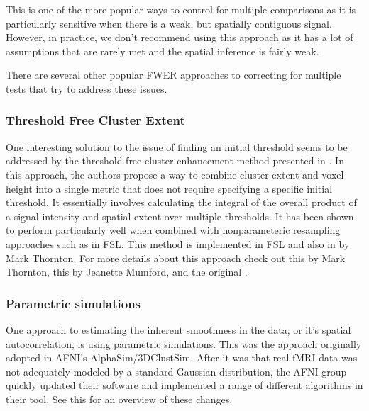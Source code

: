 \documentclass[letterpaper,10pt,english]{sphinxmanual}
\begin{document}
This is one of the more popular ways to control for multiple comparisons as it is particularly sensitive when there is a weak, but spatially contiguous signal. However, in practice, we don’t recommend using this approach as it has a lot of assumptions that are rarely met and the spatial inference is fairly weak.

There are several other popular FWER approaches to correcting for multiple tests that try to address these issues.


\subsubsection{Threshold Free Cluster Extent}
\label{\detokenize{content/Thresholding_Group_Analyses:threshold-free-cluster-extent}}
One interesting solution to the issue of finding an initial threshold seems to be addressed by the threshold free cluster enhancement method presented in . In this approach, the authors propose a way to combine cluster extent and voxel height into a single metric that does not require specifying a specific initial threshold. It essentially involves calculating the integral of the overall product of a signal intensity and spatial extent over multiple thresholds. It has been shown to perform particularly well when combined with non\sphinxhyphen{}parameteric resampling approaches such as  in FSL. This method is implemented in FSL and also in  by Mark Thornton. For more details about this approach check out this  by Mark Thornton, this  by Jeanette Mumford, and the original .


\subsubsection{Parametric simulations}
\label{\detokenize{content/Thresholding_Group_Analyses:parametric-simulations}}
One approach to estimating the inherent smoothness in the data, or it’s spatial autocorrelation, is using parametric simulations. This was the approach originally adopted in AFNI’s AlphaSim/3DClustSim. After it was  that real fMRI data was not adequately modeled by a standard Gaussian distribution, the AFNI group quickly updated their software and implemented a range of different algorithms in their  tool. See this  for an overview of these changes.
\end{document}
